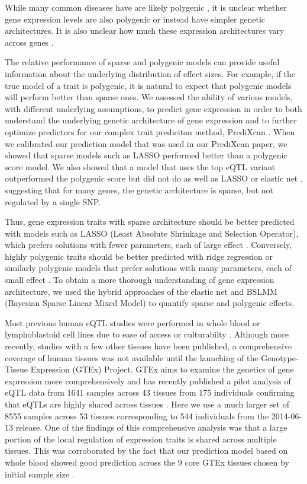 \documentclass[10pt,letterpaper]{article}
\begin{document}
While many common diseases have are likely polygenic \cite{Purcell_2009,Stahl_2012,Morris_2012}, it is unclear whether gene expression levels are also polygenic or instead have simpler genetic architectures. It is also unclear how much these expression architectures vary across genes \cite{Albert_2015}. 

The relative performance of sparse and polygenic models can provide useful information about the underlying distribution of effect sizes. For example, if the true model of a trait is polygenic, it is natural to expect that polygenic models will perform better than sparse ones. We assessed the ability of various models, with different underlying assumptions, to predict gene expression in order to both understand the underlying genetic architecture of gene expression and to further optimize predictors for our complex trait prediciton method, PrediXcan \cite{Gamazon_2015}. When we calibrated our prediction model that was used in our PrediXcan paper, we showed that sparse models such as LASSO performed better than a polygenic score model. We also showed that a model that uses the top eQTL variant outperformed the polygenic score but did not do as well as LASSO or elastic net \cite{Gamazon_2015}, suggesting that for many genes, the genetic architecture is sparse, but not regulated by a single SNP. 

Thus, gene expression traits with sparse architecture should be better predicted with models such as LASSO (Least Absolute Shrinkage and Selection Operator), which prefers solutions with fewer parameters, each of large effect \cite{Tibshirani_1996}. Conversely, highly polygenic traits should be better predicted with ridge regression or similarly polygenic models that prefer solutions with many parameters, each of small effect \cite{Hoerl_1970,de_los_Campos_2010,Wheeler_2014}. To obtain a more thorough understanding of gene expression architecture, we used the hybrid approaches of the elastic net and BSLMM (Bayesian Sparse Linear Mixed Model) \cite{Zhou_2013} to quantify sparse and polygenic effects.

Most previous human eQTL studies were performed in whole blood or lymphoblastoid cell lines due to ease of access or culturabilty \cite{Stranger_2007,Cheung_2005,Battle_2013}. Although more recently, studies with a few other tissues have been published, a comprehensive coverage of human tissues was not available until the launching of the Genotype-Tissue Expression (GTEx) Project. GTEx aims to examine the genetics of gene expression more comprehensively and has recently published a pilot analysis of eQTL data from 1641 samples across 43 tissues from 175 individuals confirming that eQTLs are highly shared across tissues \cite{Ardlie_2015}. Here we use a much larger set of 8555 samples across 53 tissues corresponding to 544 individuals from the 2014-06-13 release. One of the findings of this comprehensive analysis was that a large portion of the local regulation of expression traits is shared across multiple tissues. This was corroborated by the fact that our prediction model based on whole blood showed good prediction across the 9 core GTEx tissues chosen by initial sample size \cite{Gamazon_2015}.
\end{document}
